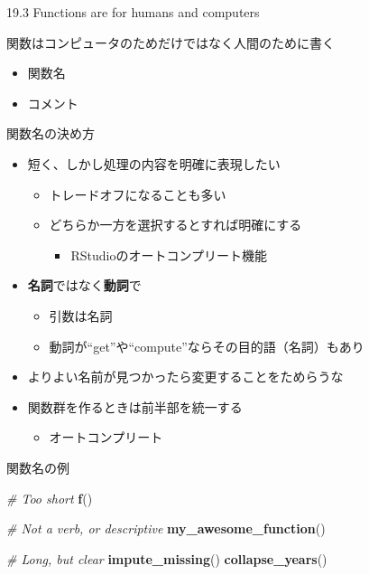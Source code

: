 \documentclass[ignorenonframetext,]{beamer}
\newenvironment{Shaded}{\begin{snugshade}}{\end{snugshade}}
\newcommand{\KeywordTok}[1]{\textcolor[rgb]{0.13,0.29,0.53}{\textbf{#1}}}
\newcommand{\CommentTok}[1]{\textcolor[rgb]{0.56,0.35,0.01}{\textit{#1}}}
\newcommand{\NormalTok}[1]{#1}
\providecommand{\tightlist}{%
  \setlength{\itemsep}{0pt}\setlength{\parskip}{0pt}}
\begin{document}
\begin{frame}{19.3 Functions are for humans and computers}

関数はコンピュータのためだけではなく人間のために書く

\begin{itemize}
\tightlist
\item
  関数名
\item
  コメント
\end{itemize}

\end{frame}

\begin{frame}{関数名の決め方}

\begin{itemize}
\tightlist
\item
  短く、しかし処理の内容を明確に表現したい

  \begin{itemize}
  \tightlist
  \item
    トレードオフになることも多い
  \item
    どちらか一方を選択するとすれば明確にする

    \begin{itemize}
    \tightlist
    \item
      RStudioのオートコンプリート機能
    \end{itemize}
  \end{itemize}
\item
  \textbf{名詞}ではなく\textbf{動詞}で

  \begin{itemize}
  \tightlist
  \item
    引数は名詞
  \item
    動詞が``get''や``compute''ならその目的語（名詞）もあり
  \end{itemize}
\item
  よりよい名前が見つかったら変更することをためらうな
\item
  関数群を作るときは前半部を統一する

  \begin{itemize}
  \tightlist
  \item
    オートコンプリート
  \end{itemize}
\end{itemize}

\end{frame}

\begin{frame}[fragile]{関数名の例}

\begin{Shaded}
\begin{Highlighting}[]
\CommentTok{# Too short}
\KeywordTok{f}\NormalTok{()}

\CommentTok{# Not a verb, or descriptive}
\KeywordTok{my_awesome_function}\NormalTok{()}

\CommentTok{# Long, but clear}
\KeywordTok{impute_missing}\NormalTok{()}
\KeywordTok{collapse_years}\NormalTok{()}
\end{Highlighting}
\end{Shaded}

\end{frame}
\end{document}
